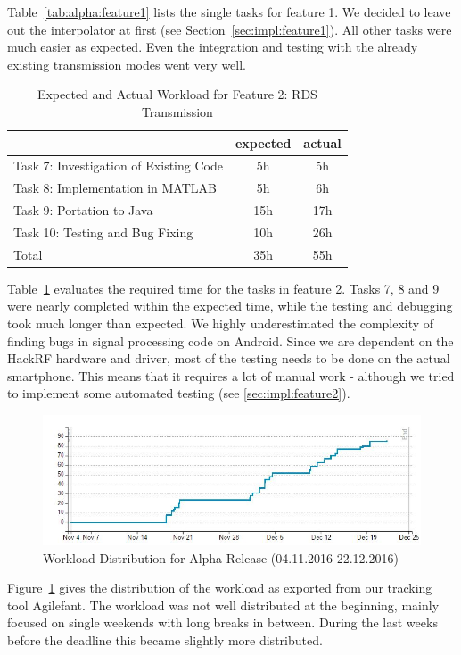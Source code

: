 Table~\ref{tab:alpha:feature1} lists the single tasks for feature 1. We decided to leave out the interpolator at first (see Section~\ref{sec:impl:feature1}). All other tasks were much easier as expected. Even the integration and testing with the already existing transmission modes went very well. 
	
	\begin{table}
		\centering
		\caption{Expected and Actual Workload for Feature 2: RDS Transmission}				\label{tab:alpha:feature2}
		\begin{tabular}{ l | c | c }
			& expected  & actual \\ \hline
			Task 7: Investigation of Existing Code&  5h & 5h \\ \hline
			Task 8: Implementation in MATLAB & 5h & 6h  \\ \hline
			Task 9: Portation to Java & 15h & 17h  \\ \hline
			Task 10: Testing and Bug Fixing & 10h & 26h \\ \hline \hline
			Total & 35h & 55h
		\end{tabular}
	\end{table}
	
	Table~\ref{tab:alpha:feature2} evaluates the required time for the tasks in feature 2. Tasks 7, 8 and 9 were nearly completed within the expected time, while the testing and debugging took much longer than expected. We highly underestimated the complexity of finding bugs in signal processing code on Android. Since we are dependent on the HackRF hardware and driver, most of the testing needs to be done on the actual smartphone. This means that it requires a lot of manual work - although we tried to implement some automated testing (see \ref{sec:impl:feature2}). 
	
	\begin{figure}
		\centering
		\includegraphics[width=1\linewidth]{gfx/Agilefant_Alpha.jpg}
		\caption{Workload Distribution for Alpha Release (04.11.2016-22.12.2016)}
		\label{fig:agilefant_alpha}
	\end{figure}
	
	Figure~\ref{fig:agilefant_alpha} gives the distribution of the workload as exported from our tracking tool Agilefant. The workload was not well distributed at the beginning, mainly focused on single weekends with long breaks in between. During the last weeks before the deadline this became slightly more distributed. 

